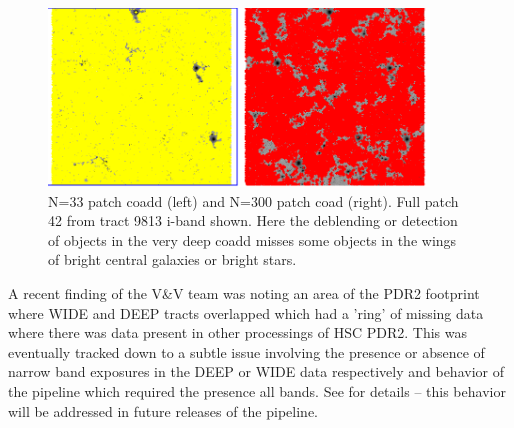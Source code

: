 \begin{itemize}
 \begin{figure}[h]
 \includegraphics[width=0.9\textwidth]{full.png}
	 \caption{N=33 patch coadd (left) and N=300 patch coad (right).  Full patch 42 from tract 9813 i-band shown. Here the deblending or detection of objects in the very deep coadd misses some objects in the wings of bright central galaxies or bright stars.  \label{fig:deblend2}}
 \end{figure}

\end{itemize}

A recent finding of the V\&V team was noting an area of the PDR2 footprint where WIDE and DEEP tracts 
overlapped which had a 'ring' of missing data where there was data present in other processings of HSC PDR2.
This was eventually tracked down to a subtle issue involving the presence or absence of narrow band
exposures in the DEEP or WIDE data respectively and behavior of the pipeline which required the
presence all bands.  See  for details -- this behavior will be addressed in future releases
of the pipeline.
